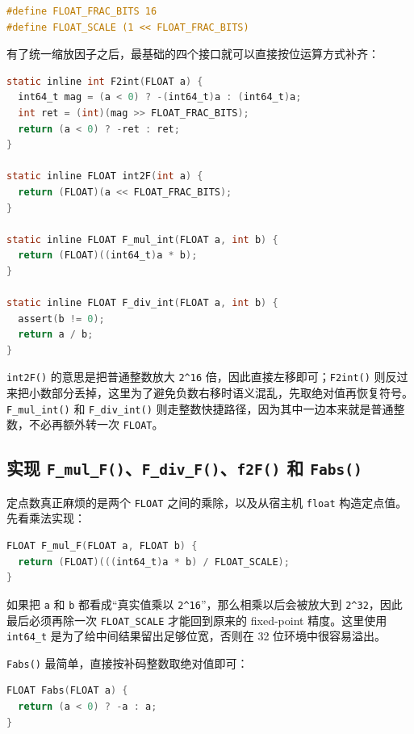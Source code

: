 \documentclass[a4paper]{article}
\begin{document}
\begin{lstlisting}[language=C]
#define FLOAT_FRAC_BITS 16
#define FLOAT_SCALE (1 << FLOAT_FRAC_BITS)
\end{lstlisting}

有了统一缩放因子之后，最基础的四个接口就可以直接按位运算方式补齐：

\begin{lstlisting}[language=C]
static inline int F2int(FLOAT a) {
  int64_t mag = (a < 0) ? -(int64_t)a : (int64_t)a;
  int ret = (int)(mag >> FLOAT_FRAC_BITS);
  return (a < 0) ? -ret : ret;
}

static inline FLOAT int2F(int a) {
  return (FLOAT)(a << FLOAT_FRAC_BITS);
}

static inline FLOAT F_mul_int(FLOAT a, int b) {
  return (FLOAT)((int64_t)a * b);
}

static inline FLOAT F_div_int(FLOAT a, int b) {
  assert(b != 0);
  return a / b;
}
\end{lstlisting}

\texttt{int2F()} 的意思是把普通整数放大 \texttt{2\^{}16} 倍，因此直接左移即可；\texttt{F2int()} 则反过来把小数部分丢掉，这里为了避免负数右移时语义混乱，先取绝对值再恢复符号。 \texttt{F\_mul\_int()} 和 \texttt{F\_div\_int()} 则走整数快捷路径，因为其中一边本来就是普通整数，不必再额外转一次 \texttt{FLOAT}。

\subsection{实现 \texttt{F\_mul\_F()}、\texttt{F\_div\_F()}、\texttt{f2F()} 和 \texttt{Fabs()}}
定点数真正麻烦的是两个 \texttt{FLOAT} 之间的乘除，以及从宿主机 \texttt{float} 构造定点值。先看乘法实现：

\begin{lstlisting}[language=C]
FLOAT F_mul_F(FLOAT a, FLOAT b) {
  return (FLOAT)(((int64_t)a * b) / FLOAT_SCALE);
}
\end{lstlisting}

如果把 \texttt{a} 和 \texttt{b} 都看成“真实值乘以 \texttt{2\^{}16}”，那么相乘以后会被放大到 \texttt{2\^{}32}，因此最后必须再除一次 \texttt{FLOAT\_SCALE} 才能回到原来的 fixed-point 精度。这里使用 \texttt{int64\_t} 是为了给中间结果留出足够位宽，否则在 32 位环境中很容易溢出。

\texttt{Fabs()} 最简单，直接按补码整数取绝对值即可：

\begin{lstlisting}[language=C]
FLOAT Fabs(FLOAT a) {
  return (a < 0) ? -a : a;
}
\end{lstlisting}
\end{document}
